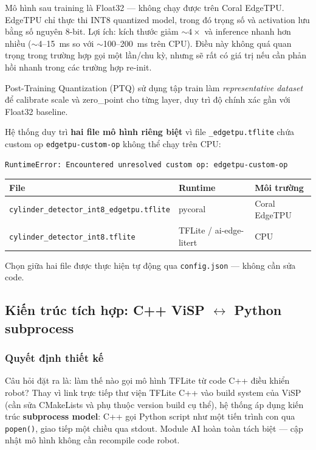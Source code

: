 Mô hình sau training là Float32 --- không chạy được trên Coral
EdgeTPU. EdgeTPU chỉ thực thi INT8 quantized model, trong đó
trọng số và activation lưu bằng số nguyên 8-bit. Lợi ích:
kích thước giảm $\sim4\times$ và inference nhanh hơn nhiều
($\sim$4--15~ms so với $\sim$100--200~ms trên CPU). Điều này
không quá quan trọng trong trường hợp gọi một lần/chu kỳ,
nhưng sẽ rất có giá trị nếu cần phản hồi nhanh trong các
trường hợp re-init.

Post-Training Quantization (PTQ) sử dụng tập train làm
\textit{representative dataset} để calibrate scale và zero\_point
cho từng layer, duy trì độ chính xác gần với Float32 baseline.

Hệ thống duy trì \textbf{hai file mô hình riêng biệt} vì file
\texttt{\_edgetpu.tflite} chứa custom op \texttt{edgetpu-custom-op}
không thể chạy trên CPU:
\begin{lstlisting}[language={}]
RuntimeError: Encountered unresolved custom op: edgetpu-custom-op
\end{lstlisting}

\begin{center}\small
\begin{tabular}{lll}
  \toprule
  File & Runtime & Môi trường \\
  \midrule
  \texttt{cylinder\_detector\_int8\_edgetpu.tflite} & pycoral & Coral EdgeTPU \\
  \texttt{cylinder\_detector\_int8.tflite}          & TFLite / ai-edge-litert & CPU \\
  \bottomrule
\end{tabular}
\end{center}

Chọn giữa hai file được thực hiện tự động qua
\texttt{config.json} --- không cần sửa code.


\subsection{Kiến trúc tích hợp: C++ ViSP \texorpdfstring{$\leftrightarrow$}{<->} Python subprocess}
\label{subsec:ai3-arch}

\subsubsection*{Quyết định thiết kế}

Câu hỏi đặt ra là: làm thế nào gọi mô hình TFLite từ code C++
điều khiển robot? Thay vì link trực tiếp thư viện TFLite C++ vào
build system của ViSP (cần sửa CMakeLists và phụ thuộc version
build cụ thể), hệ thống áp dụng kiến trúc \textbf{subprocess
model}: C++ gọi Python script như một tiến trình con qua
\texttt{popen()}, giao tiếp một chiều qua stdout. Module AI
hoàn toàn tách biệt --- cập nhật mô hình không cần recompile
code robot.

